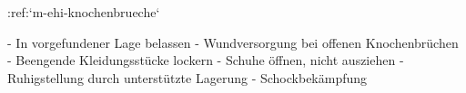 :ref:`m-ehi-knochenbrueche`
\begin{itemize}
    -   In vorgefundener Lage belassen
    -   Wundversorgung bei offenen Knochenbrüchen
    -   Beengende Kleidungsstücke lockern
    -   Schuhe öffnen, nicht ausziehen
    -   Ruhigstellung durch unterstützte Lagerung
    -   Schockbekämpfung
\end{itemize}